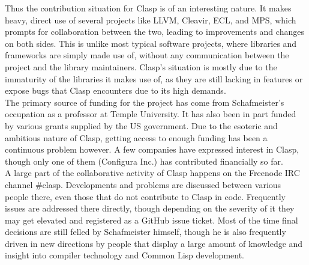 Thus the contribution situation for Clasp is of an interesting nature. It makes heavy, direct use of several projects like LLVM, Cleavir, ECL, and MPS, which prompts for collaboration between the two, leading to improvements and changes on both sides. This is unlike most typical software projects, where libraries and frameworks are simply made use of, without any communication between the project and the library maintainers. Clasp's situation is mostly due to the immaturity of the libraries it makes use of, as they are still lacking in features or expose bugs that Clasp encounters due to its high demands. \\

The primary source of funding for the project has come from Schafmeister's occupation as a professor at Temple University. It has also been in part funded by various grants supplied by the US government\cite{clasp-grants}. Due to the esoteric and ambitious nature of Clasp, getting access to enough funding has been a continuous problem however. A few companies have expressed interest in Clasp, though only one of them (Configura Inc.) has contributed financially so far. \\

A large part of the collaborative activity of Clasp happens on the Freenode IRC channel \#clasp. Developments and problems are discussed between various people there, even those that do not contribute to Clasp in code. Frequently issues are addressed there directly, though depending on the severity of it they may get elevated and registered as a GitHub issue ticket. Most of the time final decisions are still felled by Schafmeister himself, though he is also frequently driven in new directions by people that display a large amount of knowledge and insight into compiler technology and Common Lisp development.

